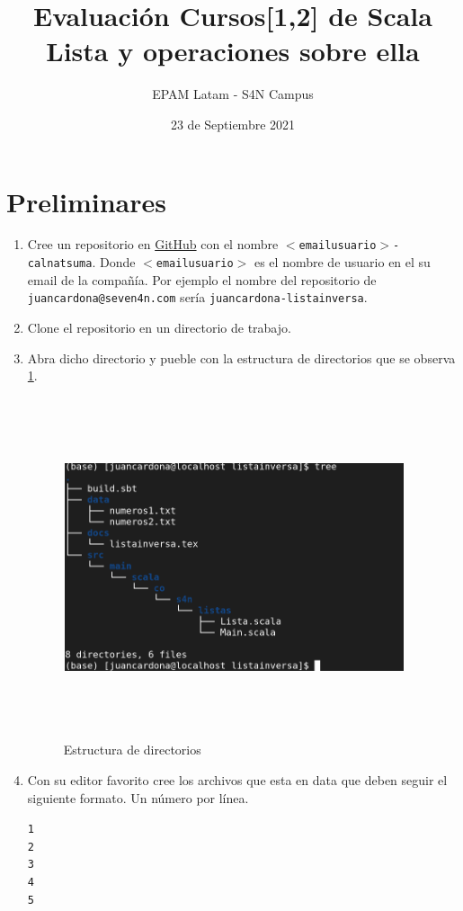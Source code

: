 \documentclass[12pt]{article}
\title{Evaluación Cursos[1,2] de Scala\\Lista y operaciones sobre ella}
\date{23 de Septiembre 2021}
\author{EPAM Latam - S4N Campus}
\begin{document}
\maketitle

\section{Preliminares}
\label{sec:preliminares}

\begin{enumerate}
\item Cree un repositorio en \href{https://github.com}{GitHub} con el nombre \texttt{$<$emailusuario$>$-calnatsuma}. Donde \texttt{$<$emailusuario$>$} es el nombre de usuario en el su email de la compañía. Por ejemplo el nombre del repositorio de \texttt{juancardona@seven4n.com} sería \texttt{juancardona-listainversa}.
\item Clone el repositorio en un directorio de trabajo.
\item Abra dicho directorio y pueble con la estructura de directorios que se observa \ref{fig:dir}.
  \begin{figure}[h]
    \centering
    \includegraphics[width=10cm,height=10cm]{../../../imagenes/jerarquia-listainversa.png}
    \caption{Estructura de directorios}
    \label{fig:dir}
  \end{figure}
\item Con su editor favorito cree los archivos que esta en data que
  deben seguir el siguiente formato. Un número por línea.
\begin{alltt}
1
2
3
4
5
\end{alltt}
\end{enumerate}
\end{document}
